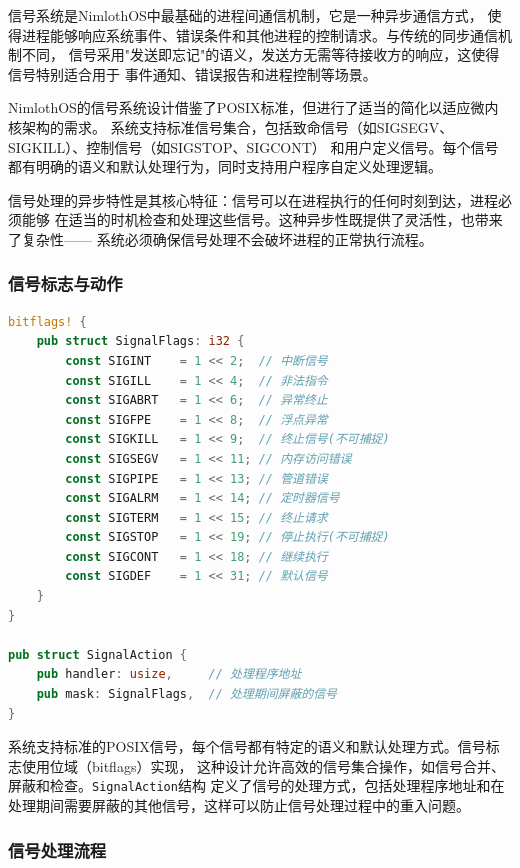 信号系统是NimlothOS中最基础的进程间通信机制，它是一种异步通信方式，
使得进程能够响应系统事件、错误条件和其他进程的控制请求。与传统的同步通信机制不同，
信号采用"发送即忘记"的语义，发送方无需等待接收方的响应，这使得信号特别适合用于
事件通知、错误报告和进程控制等场景。

NimlothOS的信号系统设计借鉴了POSIX标准，但进行了适当的简化以适应微内核架构的需求。
系统支持标准信号集合，包括致命信号（如SIGSEGV、SIGKILL）、控制信号（如SIGSTOP、SIGCONT）
和用户定义信号。每个信号都有明确的语义和默认处理行为，同时支持用户程序自定义处理逻辑。

信号处理的异步特性是其核心特征：信号可以在进程执行的任何时刻到达，进程必须能够
在适当的时机检查和处理这些信号。这种异步性既提供了灵活性，也带来了复杂性——
系统必须确保信号处理不会破坏进程的正常执行流程。

\subsubsection{信号标志与动作}

\begin{lstlisting}[language=Rust,caption={信号标志定义}, label={lst:signal-flags}]
bitflags! {
    pub struct SignalFlags: i32 {
        const SIGINT    = 1 << 2;  // 中断信号
        const SIGILL    = 1 << 4;  // 非法指令
        const SIGABRT   = 1 << 6;  // 异常终止
        const SIGFPE    = 1 << 8;  // 浮点异常
        const SIGKILL   = 1 << 9;  // 终止信号(不可捕捉)
        const SIGSEGV   = 1 << 11; // 内存访问错误
        const SIGPIPE   = 1 << 13; // 管道错误
        const SIGALRM   = 1 << 14; // 定时器信号
        const SIGTERM   = 1 << 15; // 终止请求
        const SIGSTOP   = 1 << 19; // 停止执行(不可捕捉)
        const SIGCONT   = 1 << 18; // 继续执行
        const SIGDEF    = 1 << 31; // 默认信号
    }
}

pub struct SignalAction {
    pub handler: usize,     // 处理程序地址
    pub mask: SignalFlags,  // 处理期间屏蔽的信号
}
\end{lstlisting}

系统支持标准的POSIX信号，每个信号都有特定的语义和默认处理方式。信号标志使用位域（bitflags）实现，
这种设计允许高效的信号集合操作，如信号合并、屏蔽和检查。\lstinline[language=Rust]{SignalAction}结构
定义了信号的处理方式，包括处理程序地址和在处理期间需要屏蔽的其他信号，这样可以防止信号处理过程中的重入问题。

\subsubsection{信号处理流程}

